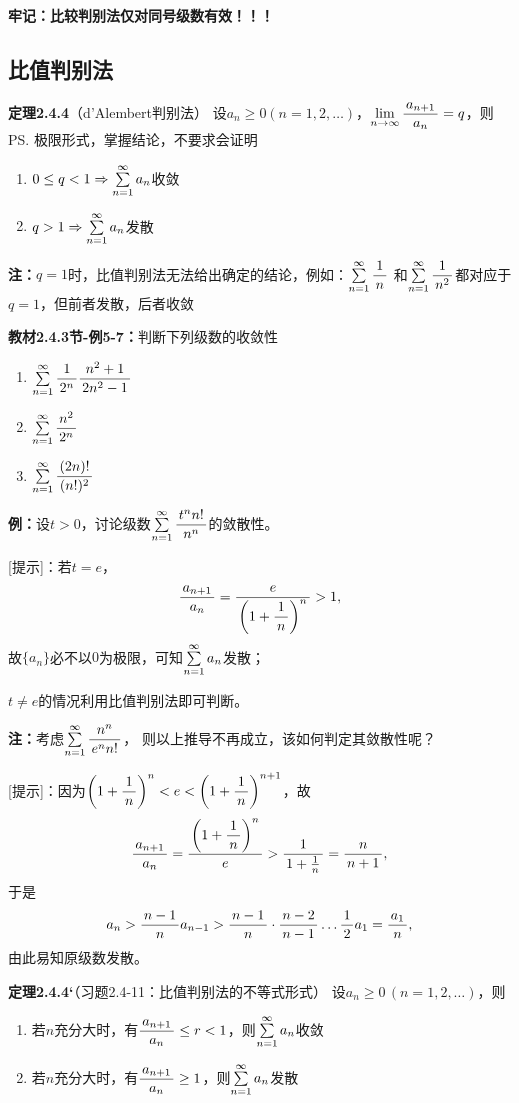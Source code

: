 {\b\bf 牢记：比较判别法仅对同号级数有效！！！}

\subsection{比值判别法}

{\bf 定理2.4.4}（d'Alembert判别法）
设$a_n\geq 0(n=1,2,\ldots)$，$\limn\df{a_{n+1}}{a_n}=q$，则
\ps{极限形式，掌握结论，不要求会证明} 
\begin{enumerate}
  \setlength{\itemindent}{1cm}
  \item $0\leq q<1\Rightarrow\sumn a_n$收敛 
  \item $q>1\Rightarrow\sumn a_n$发散
\end{enumerate}

{\bf 注：}$q=1$时，比值判别法无法给出确定的结论，例如：$\sumn\df 1n$
和$\sumn\df 1{n^2}$都对应于$q=1$，但前者发散，后者收敛

{\bf 教材2.4.3节-例5-7：}判断下列级数的收敛性
\begin{enumerate} [(1)]
  \setlength{\itemindent}{1cm}
  \item $\sumn\df 1{2^n}\df{n^2+1}{2n^2-1}$ 
  \item $\sumn\df{n^2}{2^n}$ 
  \item $\sumn\df{(2n)!}{(n!)^2}$
\end{enumerate}

{\bf 例：}设$t>0$，讨论级数$\sumn\df{t^nn!}{n^n}$的敛散性。

[提示]：若$t=e$，
$$\df{a_{n+1}}{a_n}=\df{e}{\left(1+\df1n\right)^n}>1,$$
故$\{a_n\}$必不以$0$为极限，可知$\sumn a_n$发散；

$t\ne e$的情况利用比值判别法即可判断。

{\bf 注：}考虑$\sumn\df{n^n}{e^nn!}$，
则以上推导不再成立，该如何判定其敛散性呢？

[提示]：因为$\left(1+\df1n\right)^n<e<\left(1+\df1n\right)^{n+1}$，故
$$\df{a_{n+1}}{a_n}=\df{\left(1+\df1n\right)^n}{e}>\df1{1+\frac1n}=\df n{n+1},$$
于是
$$a_n>\df{n-1}na_{n-1}>\df{n-1}n\cdot\df{n-2}{n-1}\ldots\df12a_1=\df{a_1}n,$$
由此易知原级数发散。

{\bf 定理2.4.4‘}（习题2.4-11：比值判别法的不等式形式）
设$a_n\geq 0\,(n=1,2,\ldots)$，则 
\begin{enumerate}
  \setlength{\itemindent}{1cm}
  \item 若$n$充分大时，有$\df{a_{n+1}}{a_n}\leq r<1$，则$\sumn a_n$收敛 
  \item 若$n$充分大时，有$\df{a_{n+1}}{a_n}\geq 1$，则$\sumn a_n$发散 
\end{enumerate}

